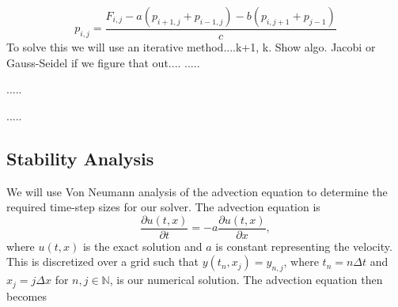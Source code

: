 \begin{equation}
    p_{i,j} = \frac{F_{i,j} - a(p_{i+1,j} + p_{i-1,j}) - b(p_{i,j+1}+p_{j-1})}{c}
\end{equation}
To solve this we will use an iterative method....k+1, k. Show algo. Jacobi or Gauss-Seidel if we figure that out....
.....

.....

.....

\subsection{Stability Analysis}
\label{subsec:von_neumann}

We will use Von Neumann analysis of the advection equation to determine the required time-step sizes for our solver. The advection equation is
\begin{equation}
    \frac{\partial u(t,x)}{\partial t} = -a \frac{\partial u(t,x)}{\partial x},
\end{equation}
where $u(t,x)$ is the exact solution and $a$ is constant representing the velocity. This is discretized over a grid such that $y(t_n,x_j)=y_{n,j}$, where $t_n = n\Delta t$ and $x_j = j\Delta x$ for $n,j\in\mathbb{N}$, is our numerical solution. The advection equation then becomes

